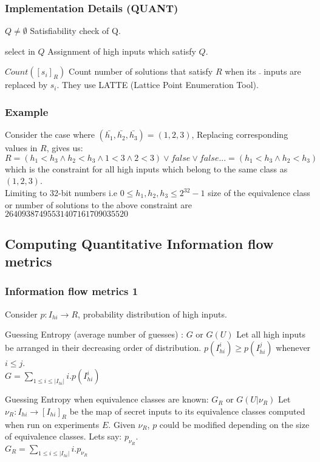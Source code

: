 \documentclass{beamer}
\begin{document}
\begin{frame}
\frametitle{Implementation Details (QUANT)}
\begin{block}{$Q \neq \emptyset$}
Satisfiability check of Q.
\end{block}
\begin{block}{select in $Q$}
Assignment of high inputs which satisfy $Q$.
\end{block}
\begin{block}{$Count([s_{i}]_{R})$}
Count number of solutions that satisfy $R$ when its $\bar{}$ inputs are replaced by $s_{i}$. They use LATTE (Lattice Point Enumeration Tool).
\end{block}
\end{frame}

\begin{frame}
\frametitle{Example}
Consider the case where $(\bar{h_{1}}, \bar{h_{2}},\bar{h_{3}}) = (1, 2, 3)$, Replacing corresponding values in $R$, gives us:
$R = (h_{1} < h_{3} \land h_{2} < h_{3} \land 1 < 3 \land 2 < 3) \lor false \lor false ... = (h_{1} < h_{3} \land h_{2} < h_{3})$\\ which is the constraint for all high inputs which belong to the same class as $(1,2,3)$. \\
Limiting to 32-bit numbers i.e $0 \leq h_{1},h_{2},h_{3} \leq 2^{32}-1$ size of the equivalence class or number of solutions to the above constraint are $26409387495531407161709035520$
\end{frame}

\subsection{Computing Quantitative Information flow metrics}
\begin{frame}
\frametitle{Information flow metrics 1}
Consider $p: I_{hi} \rightarrow R$, probability distribution of high inputs.
\begin{block}{Guessing Entropy (average number of guesses) : $G$ or $G(U)$}
Let all high inputs be arranged in their decreasing order of distribution. $p(I_{hi}^{i}) \geq p(I_{hi}^{j})$ whenever $i \leq j$. \\
$G = \sum_{1 \leq i \leq |I_{hi}|} i.p(I_{hi}^{i})$
\end{block}
\begin{block}{Guessing Entropy when equivalence classes are known: $G_{R}$ or $G(U|\nu_{R})$}
Let $\nu_{R} : I_{hi} \rightarrow [I_{hi}]_{R}$  be the map of secret inputs to its equivalence classes computed when run on experiments $E$. Given $\nu_{R}$, $p$ could be modified depending on the size of equivalence classes. Lets say: $p_{\nu_{R}}$.\\
$G_{R} = \sum_{1 \leq i \leq |I_{hi}|} i.p_{\nu_{R}}$
\end{block}
\end{frame}
\end{document}
